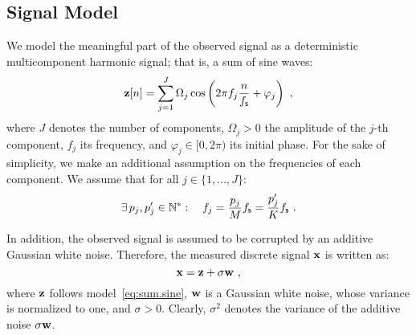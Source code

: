 \subsection{Signal Model}
\label{sse:model.sine}
We model the meaningful part of the observed signal as a deterministic multicomponent harmonic signal; that is, a sum of sine waves:
\begin{equation}
\bz[n]=\sum_{j=1}^J\Omega_j\cos\left(2\pi f_j \frac{n}{\fs} + \varphi_j\right)\ ,
\label{eq:sum.sine}
\end{equation}
where $J$ denotes the number of components, $\Omega_j>0$ the amplitude of the $j$-th component, $f_j$ its frequency, and $\varphi_j\in[0,2\pi)$ its initial phase.
%
For the sake of simplicity, we make an additional assumption on the frequencies of each component. We assume that for all $j\in\{1,\dots,J\}$:
\begin{equation}
\exists\, p_j,p_j'\in\mathbb N^*: \quad f_j = \dfrac{p_j}{M}f_{\mathsf s} = \dfrac{p'_j}{K}f_{\mathsf s}\ .
\end{equation}


In addition, the observed signal is assumed to be corrupted by an additive Gaussian white noise. Therefore, the measured discrete signal ${\mathbf x}$ is written as:
\begin{equation}
\bx = \bz + \sigma\bw\ ,
\label{eq:model.noise}
\end{equation}
where ${\mathbf z}$ follows model~\eqref{eq:sum.sine}, ${\mathbf w}$ is a Gaussian white noise, whose variance is normalized to one, and $\sigma>0$. Clearly, $\sigma^2$ denotes the variance of the additive noise $\sigma{\mathbf w}$.


